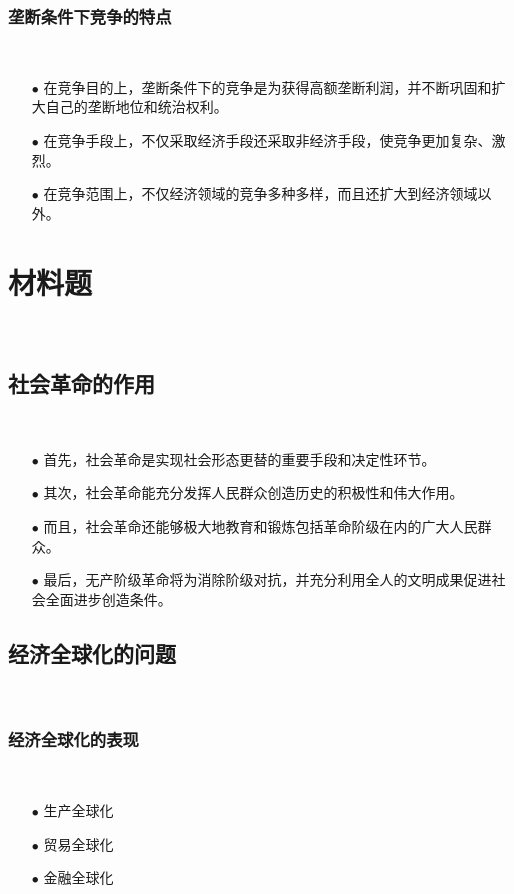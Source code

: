 \documentclass{ctexart}
\begin{document}
\subsubsection{垄断条件下竞争的特点}~{}
\vspace{-5mm}
\begin{itemize}
\item[$\bullet$]在竞争目的上，垄断条件下的竞争是为获得高额垄断利润，并不断巩固和扩大自己的垄断地位和统治权利。
\item[$\bullet$]在竞争手段上，不仅采取经济手段还采取非经济手段，使竞争更加复杂、激烈。
\item[$\bullet$]在竞争范围上，不仅经济领域的竞争多种多样，而且还扩大到经济领域以外。
\end{itemize}

\newpage
\section{材料题}~{}
\subsection{社会革命的作用}~{}
\vspace{-5mm}
\begin{itemize}
\item[$\bullet$]首先，社会革命是实现社会形态更替的重要手段和决定性环节。
\item[$\bullet$]其次，社会革命能充分发挥人民群众创造历史的积极性和伟大作用。
\item[$\bullet$]而且，社会革命还能够极大地教育和锻炼包括革命阶级在内的广大人民群众。
\item[$\bullet$]最后，无产阶级革命将为消除阶级对抗，并充分利用全人的文明成果促进社会全面进步创造条件。 
\end{itemize}


\vspace{+10mm}
\subsection{经济全球化的问题}~{}
\vspace{-5mm}

\subsubsection{经济全球化的表现}~{}
\vspace{-5mm}
\begin{itemize}
\item[$\bullet$]生产全球化
\item[$\bullet$]贸易全球化
\item[$\bullet$]金融全球化
\end{itemize}
\end{document}
